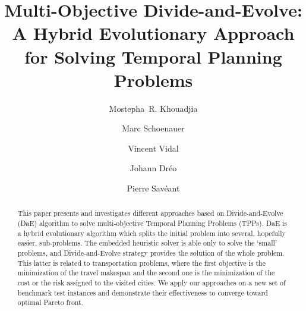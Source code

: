 \documentclass{llncs}
\begin{document}
\mainmatter              %
%
\title{Multi-Objective Divide-and-Evolve: A Hybrid Evolutionary Approach for Solving Temporal Planning Problems}
%
%
\author{Mostepha~R. Khouadjia  \and Marc Schoenauer\and
Vincent Vidal  \and Johann Dr\'eo \and Pierre Savéant}
%
%
%

\maketitle              %

\begin{abstract}

This paper presents and investigates different approaches  based on  Divide-and-Evolve  (DaE) algorithm to solve  multi-objective Temporal Planning Problems (TPPs).
DaE is a hybrid evolutionary algorithm  which splits the initial problem  into several, hopefully easier, sub-problems. The embedded heuristic solver is able  only to solve the ‘small’ problems, and Divide-and-Evolve strategy provides the solution of the whole problem.
This latter is related to transportation problems, where the first objective is the minimization of the travel makespan   and the second one is the minimization of the cost or the risk assigned to the visited cities.
We apply  our approaches  on a new set of benchmark test instances and demonstrate their effectiveness to converge toward optimal Pareto front.
 

\end{abstract}
%
\end{document}
